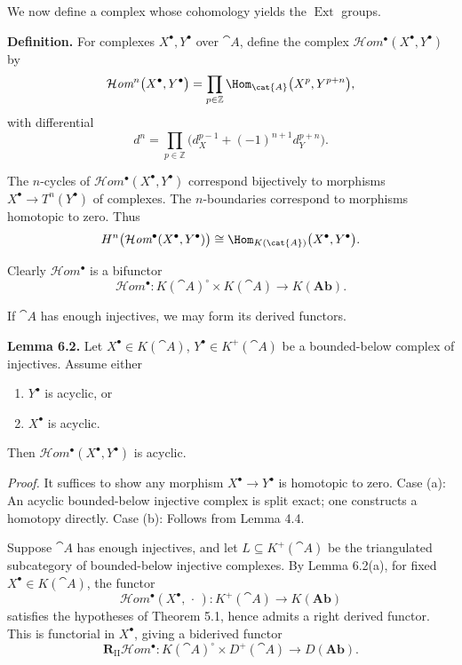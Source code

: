 We now define a complex whose cohomology yields the \(\operatorname{Ext}\) groups.

\textbf{Definition.}
For complexes \(X^\bullet,Y^\bullet\) over \(\cat{A}\), define the complex
\(\mathcal{H}\textit{om}^\bullet(X^\bullet,Y^\bullet)\) by
\[
\mathcal{H}\textit{om}^n\big(X^\bullet,Y^\bullet\big)
= \prod_{p\in\mathbb{Z}} \Hom_{\cat{A}}\big(X^p,Y^{p+n}\big),
\]
with differential
\[
d^n = \prod_{p\in\mathbb{Z}} \big(d_X^{p-1} + (-1)^{n+1}d_Y^{p+n}\big).
\]

\setcounter{page}{64}
The \(n\)-cycles of \(\mathcal{H}\textit{om}^\bullet(X^\bullet,Y^\bullet)\) correspond bijectively
to morphisms \(X^\bullet\to T^n(Y^\bullet)\) of complexes.
The \(n\)-boundaries correspond to morphisms homotopic to zero.
Thus
\[
H^n\big(\mathcal{H}\textit{om}^\bullet(X^\bullet,Y^\bullet)\big)
\cong \Hom_{K(\cat{A})}\big(X^\bullet,Y^\bullet\big).
\]

Clearly \(\mathcal{H}\textit{om}^\bullet\) is a bifunctor
\[
\mathcal{H}\textit{om}^\bullet\colon K(\cat{A})^\circ \times K(\cat{A}) \to K(\mathbf{Ab}).
\]

If \(\cat{A}\) has enough injectives, we may form its derived functors.

\textbf{Lemma 6.2.}
Let \(X^\bullet\in K(\cat{A})\), \(Y^\bullet\in K^+(\cat{A})\) be a bounded-below complex of injectives.
Assume either
\begin{enumerate}
\item[(a)] \(Y^\bullet\) is acyclic, or
\item[(b)] \(X^\bullet\) is acyclic.
\end{enumerate}
Then \(\mathcal{H}\textit{om}^\bullet(X^\bullet,Y^\bullet)\) is acyclic.

\textit{Proof.}
It suffices to show any morphism \(X^\bullet\to Y^\bullet\) is homotopic to zero.
Case (a): An acyclic bounded-below injective complex is split exact; one constructs a homotopy directly.
Case (b): Follows from Lemma 4.4.

\setcounter{page}{65}
Suppose \(\cat{A}\) has enough injectives, and let \(L\subseteq K^+(\cat{A})\) be the triangulated
subcategory of bounded-below injective complexes.
By Lemma 6.2(a), for fixed \(X^\bullet\in K(\cat{A})\), the functor
\[
\mathcal{H}\textit{om}^\bullet(X^\bullet,\,\cdot\,)\colon K^+(\cat{A})\to K(\mathbf{Ab})
\]
satisfies the hypotheses of Theorem 5.1, hence admits a right derived functor.
This is functorial in \(X^\bullet\), giving a biderived functor
\[
\mathbf{R}_\mathrm{II}\mathcal{H}\textit{om}^\bullet
\colon K(\cat{A})^\circ \times D^+(\cat{A}) \to D(\mathbf{Ab}).
\]

